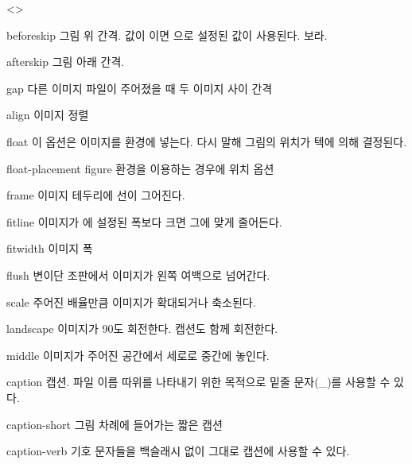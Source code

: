 \documentclass[pairquote, minted]{hzguide}
\begin{document}
\begin{macros}<\ImageSetup>
\item[beforeskip] \keyvalue{\hznulldim, 0.5\onelineskip}
그림 위 간격. 
값이 \macro{\hznulldim}이면 \macro{\ObjectSetup}으로 설정된 값이 사용된다.
\를 보라.

\item[afterskip] \keyvalue{\hznulldim, 0.5\onelineskip}
그림 아래 간격. 

\item[gap] \keyvalue{1em}
다른 이미지 파일이 주어졌을 때 두 이미지 사이 간격

\item[align] \keyvalue{\raggedleft, \centering, \raggedright}
이미지 정렬

\item[float] \keyvalueTF
이 옵션은 이미지를  환경에 넣는다. 다시 말해 그림의 위치가 텍에 의해 결정된다.

\item[float-placement] 
figure 환경을 이용하는 경우에 위치 옵션

\item[frame] \keyvalueTF
이미지 테두리에 선이 그어진다.

\item[fitline] \keyvalueTF
이미지가 에 설정된 폭보다 크면 그에 맞게 줄어든다.

\item[fitwidth] \keyvalue{\linewidth}
이미지 폭

\item[flush] \keyvalueTF
변이단 조판에서 이미지가 왼쪽 여백으로 넘어간다.

\item[scale] 
주어진 배율만큼 이미지가 확대되거나 축소된다.

\item[landscape] \keyvalueTF
이미지가 90도 회전한다. 캡션도 함께 회전한다.

\item[middle] \keyvalueTF
이미지가 주어진 공간에서 세로로 중간에 놓인다.

\item[caption] 
캡션. 파일 이름 따위를 나타내기 위한 목적으로 밑줄 문자(\_)를 사용할 수 있다.

\item[caption-short] 
그림 차례에 들어가는 짧은 캡션

\item[caption-verb] \keyvalueTF
기호 문자들을 백슬래시 없이 그대로 캡션에 사용할 수 있다.


\end{macros}
\end{document}
